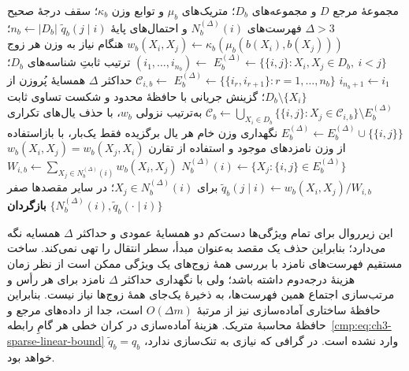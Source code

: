 \begin{algorithm}[!htbp]
\caption{زیرروال $\operatorname{BuildVertical}$: ساخت گراف عمودی و احتمال‌های پایه}
\label{cmp:alg:ch3-build-vertical}
\begin{algorithmic}[1]
\REQUIRE مجموعهٔ مرجع $D$ و مجموعه‌های $D_b$؛
متریک‌های $\mu_b$ و توابع وزن $\kappa_b$؛
سقف درجهٔ صحیح $\Delta>3$
\ENSURE فهرست‌های $N_b^{(\Delta)}(i)$ و
احتمال‌های پایهٔ $\widetilde q_b(j\mid i)$
    \STATE $n_b\gets |D_b|$؛
    $w_b(X_i,X_j)\gets
    \kappa_b(\mu_b(b(X_i),b(X_j)))$
    هنگام نیاز به وزن هر زوج
        \STATE $E_b^{(\Delta)}\gets
        \{\{i,j\}:X_i,X_j\in D_b,\ i<j\}$
    \ELSE
        \STATE $(i_1,\ldots,i_{n_b})\gets$
        ترتیب ثابتِ شناسه‌های $D_b$؛
        $i_{n_b+1}\gets i_1$
        \STATE $E_b^{(\Delta)}
        \gets\{\{i_r,i_{r+1}\}:
        r=1,\ldots,n_b\}$
            \STATE $\mathcal C_{i,b}\gets$
            حداکثر $\Delta$ همسایهٔ
            پُروزن از $D_b\setminus\{X_i\}$؛
            گزینش جریانی با حافظهٔ
            محدود و شکست تساوی ثابت
        \ENDFOR
        \STATE $\mathcal C_b\gets
        \bigcup_{X_i\in D_b}
        \{\{i,j\}:X_j\in\mathcal C_{i,b}\}
        \setminus E_b^{(\Delta)}$
        به‌ترتیب نزولی $w_b$،
        با حذف یال‌های تکراری
                \STATE $E_b^{(\Delta)}
                \gets E_b^{(\Delta)}\cup\{\{i,j\}\}$
            \ENDIF
        \ENDFOR
    \ENDIF
    \STATE نگهداری وزن خام هر یال برگزیده
    فقط یک‌بار، با بازاستفاده از وزن نامزدهای موجود
    و استفاده از تقارن $w_b(X_i,X_j)=w_b(X_j,X_i)$
        \STATE $N_b^{(\Delta)}(i)\gets
        \{X_j:\{i,j\}\in E_b^{(\Delta)}\}$
        \STATE $W_{i,b}\gets
        \sum_{X_j\in N_b^{(\Delta)}(i)}
        w_b(X_i,X_j)$
        \STATE $\widetilde q_b(j\mid i)\gets
        w_b(X_i,X_j)/W_{i,b}$
        برای $X_j\in N_b^{(\Delta)}(i)$؛
        در سایر مقصدها صفر
    \ENDFOR
\ENDFOR
\STATE \textbf{بازگردان}
$\{N_b^{(\Delta)}(i),\widetilde q_b(\cdot\mid i)\}$
\end{algorithmic}
\end{algorithm}

این زیرروال برای تمام ویژگی‌ها
دست‌کم دو همسایهٔ عمودی و حداکثر
$\Delta$ همسایه نگه می‌دارد؛
بنابراین حذف یک مقصد به‌عنوان
مبدأ، سطر انتقال را تهی نمی‌کند.
ساخت مستقیم فهرست‌های
نامزد با بررسی همهٔ زوج‌های
یک ویژگی ممکن است از نظر زمان
هزینهٔ درجه‌دوم داشته باشد؛
ولی با نگهداری حداکثر
$\Delta$ نامزد برای هر رأس
و مرتب‌سازی اجتماع همین فهرست‌ها،
به ذخیرهٔ یک‌جای همهٔ زوج‌ها
نیاز نیست. بنابراین حافظهٔ
ساختاری آماده‌سازی نیز از
مرتبهٔ $O(\Delta m)$ است،
جدا از داده‌های مرجع و حافظهٔ
محاسبهٔ متریک. هزینهٔ
آماده‌سازی در کران خطی
هر گامِ
رابطه~\eqref{cmp:eq:ch3-sparse-linear-bound}
وارد نشده است. در گرافی که
نیازی به تنک‌سازی ندارد،
$\widetilde q_b=q_b$ خواهد بود.

